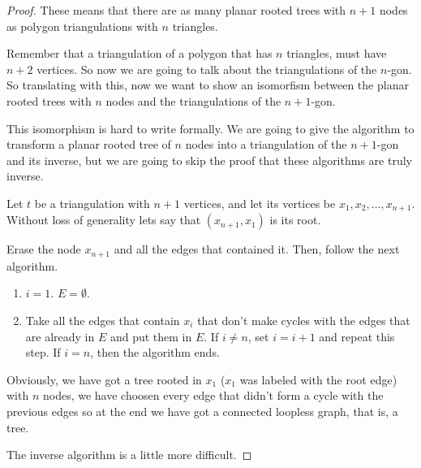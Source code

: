 \begin{proof}
    These means that there are as many planar rooted trees with $n + 1$ nodes as polygon triangulations with $n$ triangles.\pn
    
    Remember that a triangulation of a polygon that has $n$ triangles, must have $n + 2$ vertices. So now we are going to talk about
    the triangulations of the $n$-gon. So translating with this, now we want to show an isomorfism between the planar rooted trees with $n$ nodes
    and the triangulations of the $n + 1$-gon.\pn
    
    This isomorphism is hard to write formally. We are going to give the algorithm to transform a planar rooted tree of $n$ nodes into a triangulation
    of the $n + 1$-gon and its inverse, but we are going to skip the proof that these algorithms are truly inverse.\pn
    
    Let $t$ be a triangulation with $n+1$ vertices, and let its vertices be $x_1, x_2, \dots, x_{n+1}$. Without loss of generality lets say that
    $(x_{n+1}, x_1)$ is its root.\pn
    
    Erase the node $x_{n+1}$ and all the edges that contained it. Then, follow the next algorithm.
    
    \begin{enumerate}
        \item
            $i = 1.$\pn
            $E = \emptyset.$
        
        \item
            Take all the edges that contain $x_i$ that don't make cycles with the edges that are already in $E$ and
            put them in $E$. If $i \neq n$, set $i = i + 1$ and repeat this step. If $i = n$, then the algorithm ends.
    \end{enumerate}
    
    Obviously, we have got a tree rooted in $x_1$ ($x_1$ was labeled with the root edge) with $n$ nodes, we have choosen every edge that 
    didn't form a cycle with the previous edges so at the end we have got a connected loopless graph, that is, a tree.
    
    The inverse algorithm is a little more difficult.
    
\end{proof}